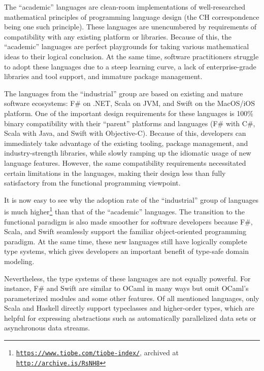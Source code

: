 The ``academic'' languages are clean-room implementations of well-researched
mathematical principles of programming language design (the CH correspondence
being one such principle). These languages are unencumbered by requirements
of compatibility with any existing platform or libraries. Because
of this, the ``academic'' languages are perfect playgrounds for
taking various mathematical ideas to their logical conclusion. At
the same time, software practitioners struggle to adopt these languages
due to a steep learning curve, a lack of enterprise-grade libraries
and tool support, and immature package management.

The languages from the ``industrial'' group are based on existing
and mature software ecosystems: F\# on .NET, Scala on JVM, and Swift
on the MacOS/iOS platform. One of the important design requirements
for these languages is 100\% binary compatibility with their ``parent''
platforms and languages (F\# with C\#, Scala with Java, and Swift
with Objective-C). Because of this, developers can immediately take
advantage of the existing tooling, package management, and industry-strength
libraries, while slowly ramping up the idiomatic usage of new language
features. However, the same compatibility requirements necessitated
certain limitations in the languages, making their design less than
fully satisfactory from the functional programming viewpoint.

It is now easy to see why the adoption rate of the ``industrial''
group of languages is much higher\footnote{\texttt{\href{https://www.tiobe.com/tiobe-index/}{https://www.tiobe.com/tiobe-index/}},
archived at \texttt{\href{http://archive.is/RsNH8}{http://archive.is/RsNH8}}} than that of the ``academic'' languages. The transition to the
functional paradigm is also made smoother for software developers
because F\#, Scala, and Swift seamlessly support the familiar object-oriented
programming paradigm. At the same time, these new languages still
have logically complete type systems, which gives developers an important
benefit of type-safe domain modeling.

Nevertheless, the type systems of these languages are not equally
powerful. For instance, F\# and Swift are similar to OCaml in many
ways but omit OCaml's parameterized modules and some other features.
Of all mentioned languages, only Scala and Haskell directly support
typeclasses and higher-order types, which are helpful for expressing
abstractions such as automatically parallelized data sets or asynchronous
data streams.

